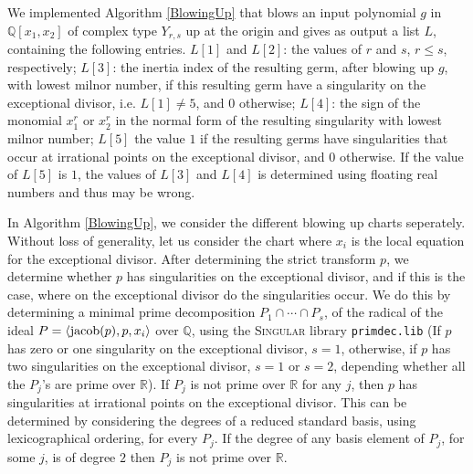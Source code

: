 \documentclass[noend]{amsproc}
\theoremstyle{definition}
\begin{document}
We implemented Algorithm \ref{BlowingUp} that blows an input polynomial $g$ in
$\mathbb Q[x_1,x_2]$ of complex type $Y_{r,s}$ up at the origin and gives as
output a list $L$, containing the following entries. $L[1]$ and $L[2]$: the
values of $r$ and $s$, $r\le s$, respectively; $L[3]$: the inertia index of the
resulting germ, after blowing up $g$, with lowest milnor number, if this
resulting germ have a singularity on the exceptional divisor, i.e. $L[1]\neq
5$, and $0$ otherwise; $L[4]$: the sign of the monomial $x_1^r$ or $x_2^r$ in
the normal form of the resulting singularity with lowest milnor number; $L[5]$
the value $1$ if the resulting germs have singularities that occur at
irrational points on the exceptional divisor, and $0$ otherwise. If the value
of $L[5]$ is $1$, the values of $L[3]$ and $L[4]$ is determined using floating
real numbers and thus may be wrong.

In Algorithm \ref{BlowingUp}, we consider the different blowing up charts
seperately. Without loss of generality, let us consider the chart where $x_i$
is the local equation for the exceptional divisor. After determining the strict
transform $p$, we determine whether $p$ has singularities on the exceptional
divisor, and if this is the case, where on the exceptional divisor do the
singularities occur. We do this by determining a minimal prime decomposition
$P_1\cap\cdots\cap P_s$, of the radical of the ideal $P=\langle
\textnormal{jacob}(p),p,x_i\rangle$ over $\mathbb Q$, using the \textsc{Singular}
library {\tt primdec.lib} \cite{primdec.lib} (If $p$ has zero or one singularity
on the exceptional divisor, $s=1$, otherwise, if $p$ has two singularities on
the exceptional divisor, $s=1$ or $s=2$, depending whether all the $P_j$'s are
prime over $\mathbb R$).  If $P_j$ is not prime over $\mathbb R$ for any $j$,
then $p$ has singularities at irrational points on the exceptional divisor.
This can be determined by considering the degrees of a reduced standard basis,
using lexicographical ordering, for every $P_j$. If the degree of any basis
element of $P_j$, for some $j$, is of degree $2$ then $P_j$ is not prime over
$\mathbb R$.
\end{document}
